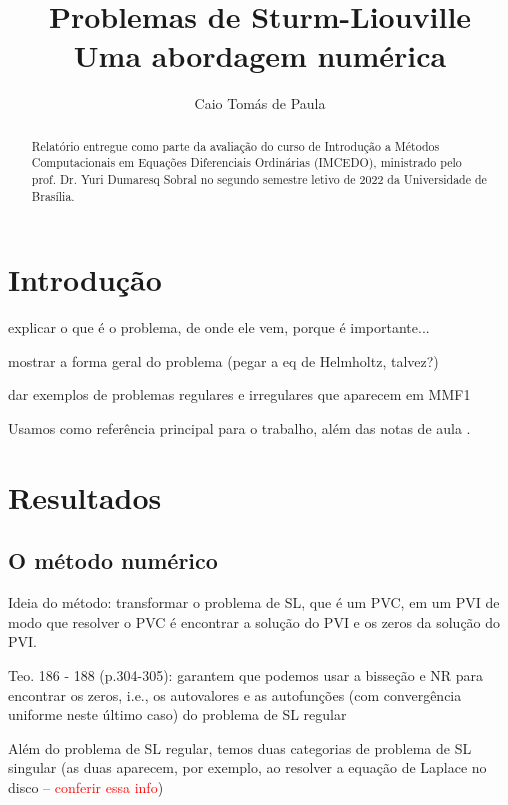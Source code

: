 \documentclass[twocolumn,showpacs,%
  nofootinbib,aps,superscriptaddress,%
  eqsecnum,prd,notitlepage,showkeys,10pt]{revtex4-1}
\begin{document}
\title{
Problemas de Sturm-Liouville \\
Uma abordagem numérica
}
\author{Caio Tomás de Paula}

\begin{abstract}
    Relatório entregue como parte da avaliação do curso de Introdução a
    Métodos Computacionais em Equações Diferenciais Ordinárias (IMCEDO),
    ministrado pelo prof. Dr. Yuri Dumaresq Sobral no segundo semestre letivo
    de 2022 da Universidade de Brasília.
\end{abstract}

\maketitle

\section{Introdução}

explicar o que é o problema, de onde ele vem, porque é importante...

mostrar a forma geral do problema (pegar a eq de Helmholtz, talvez?)

dar exemplos de problemas regulares e irregulares que aparecem em MMF1

Usamos \cite{Sturm-Liouville} como referência principal para o trabalho, além
das notas de aula \cite{notas-aula-IMCEDO}.

\section{Resultados}
\label{sec:resultados}

\subsection{O método numérico}

Ideia do método: transformar o problema de SL, que é um PVC, em um PVI
de modo que resolver o PVC é encontrar a solução do PVI e os zeros da solução
do PVI.

Teo. 186 - 188 (p.304-305): 
garantem que podemos usar a bisseção e NR para encontrar os zeros, i.e.,
os autovalores e as autofunções (com convergência uniforme neste último caso) do problema de SL regular

Além do problema de SL regular, temos duas categorias de problema de
SL singular (as duas aparecem, por exemplo, ao resolver a equação
de Laplace no disco -- \textcolor{red}{conferir essa info})
\end{document}
